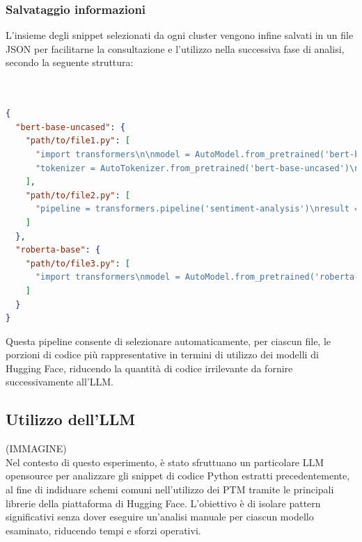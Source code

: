 \documentclass{article}
\begin{document}
\subsubsection{Salvataggio informazioni}
L'insieme degli snippet selezionati da ogni cluster vengono infine salvati in un file JSON per facilitarne la consultazione e l’utilizzo nella successiva fase di analisi, secondo la seguente struttura:\\\\\\
\begin{lstlisting}[language=json, caption={Esempio di struttura JSON dei migliori snippet selezionati}, label={lst:json-snippet}]
{
  "bert-base-uncased": {
    "path/to/file1.py": [
      "import transformers\n\nmodel = AutoModel.from_pretrained('bert-base-uncased')",
      "tokenizer = AutoTokenizer.from_pretrained('bert-base-uncased')\ninputs = tokenizer('Hello world', return_tensors='pt')"
    ],
    "path/to/file2.py": [
      "pipeline = transformers.pipeline('sentiment-analysis')\nresult = pipeline('I love coding!')"
    ]
  },
  "roberta-base": {
    "path/to/file3.py": [
      "import transformers\nmodel = AutoModel.from_pretrained('roberta-base')"
    ]
  }
}
\end{lstlisting}
Questa pipeline consente di selezionare automaticamente, per ciascun file, le porzioni di codice più rappresentative in termini di utilizzo dei modelli di Hugging Face, riducendo la quantità di codice irrilevante da fornire successivamente all'LLM.


\subsection{Utilizzo dell'LLM}
(IMMAGINE)\\
Nel contesto di questo esperimento, è stato sfruttuano un particolare LLM opensource per analizzare gli snippet di codice Python estratti precedentemente, al fine di indiduare schemi comuni nell'utilizzo dei PTM tramite le principali librerie della piattaforma di Hugging Face.
L'obiettivo è di isolare pattern significativi senza dover eseguire un'analisi manuale per ciascun modello esaminato, riducendo tempi e sforzi operativi.
\end{document}
